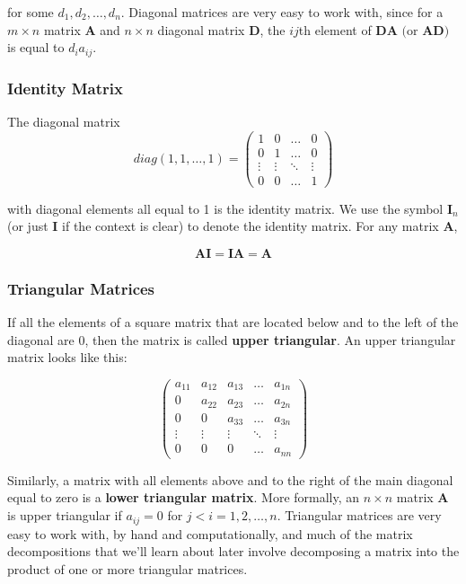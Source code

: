 \documentclass[11pt]{article}
\theoremstyle{definition}
\begin{document}
for some $d_1, d_2, \hdots, d_n$.  Diagonal matrices are very easy to work with, since for a $m \times n$ matrix $\mathbf{A}$ and $n \times n$ diagonal matrix $\mathbf{D}$, the $ij$th element of $\mathbf{DA} \text{ (or }\mathbf{AD})$ is equal to $d_i a_{ij}$.  

\subsubsection{Identity Matrix}
The diagonal matrix
\[diag(1,1,\hdots, 1) = 
\begin{pmatrix}
    1 & 0 & \dots  & 0 \\
    0 & 1  & \dots  & 0 \\
    \vdots & \vdots  & \ddots & \vdots \\
    0 & 0  & \dots  & 1
\end{pmatrix}
\]

with diagonal elements all equal to 1 is the identity matrix.  We use the symbol $\mathbf{I}_n$ (or just $\mathbf{I}$ if the context is clear) to denote the identity matrix.  For any matrix $\mathbf{A}$,

\[\mathbf{AI} = \mathbf{IA} = \mathbf{A}\]

\subsubsection{Triangular Matrices}
If all the elements of a square matrix that are located below and to the left of the diagonal are 0, then the matrix is called \textbf{upper triangular}.  An upper triangular matrix looks like this:

\[\begin{pmatrix}
    a_{11} & a_{12} & a_{13}& \dots  & a_{1n} \\
    0 & a_{22}  & a_{23} & \dots  & a_{2n} \\
        0 & 0  & a_{33} & \dots  & a_{3n} \\
    \vdots & \vdots & \vdots  & \ddots & \vdots \\
    0 & 0  & 0 & \dots  & a_{nn}
\end{pmatrix}
\]

Similarly, a matrix with all elements above and to the right of the main diagonal equal to zero is a \textbf{lower triangular matrix}.  More formally, an $n \times n$ matrix $\mathbf{A}$ is upper triangular if $a_{ij} = 0$ for $j < i = 1, 2, \hdots, n$.  Triangular matrices are very easy to work with, by hand and computationally, and much of the matrix decompositions that we'll learn about later involve decomposing a matrix into the product of one or more triangular matrices.
\end{document}

